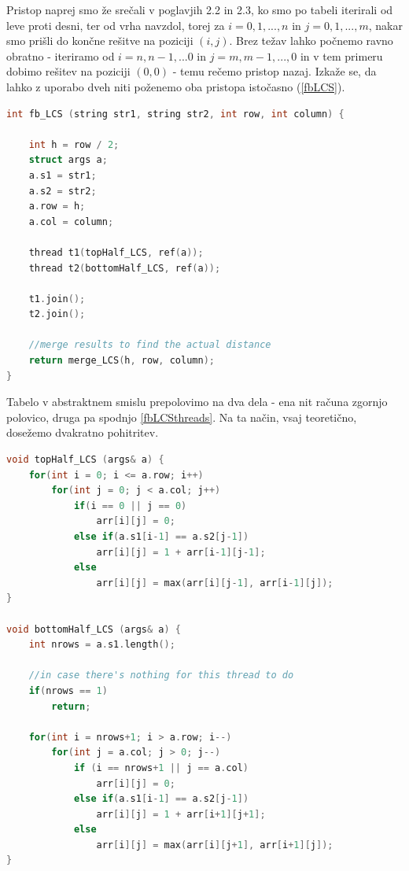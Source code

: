 \documentclass[a4paper,12pt,openright]{book}
\begin{document}
Pristop naprej smo že srečali v poglavjih 2.2 in 2.3, ko smo po tabeli iterirali od leve proti desni, ter od vrha navzdol, torej za \begin{math}i = 0, 1, ..., n\end{math} in \begin{math}j = 0, 1, ..., m\end{math}, nakar smo prišli do končne rešitve na poziciji \begin{math}(i, j)\end{math}. Brez težav lahko počnemo ravno obratno - iteriramo od \begin{math}i = n, n-1, ... 0\end{math} in \begin{math}j = m, m-1, ..., 0\end{math} in v tem primeru dobimo rešitev na poziciji \begin{math}(0, 0)\end{math} - temu rečemo pristop nazaj. Izkaže se, da lahko z uporabo dveh niti poženemo oba pristopa istočasno (\ref{fbLCS}). 

\bigskip
\begin{lstlisting}[language=C++, caption={Algoritem LCS naprej-nazaj}, captionpos=b, label=fbLCS]
int fb_LCS (string str1, string str2, int row, int column) {

    int h = row / 2;
    struct args a; 
    a.s1 = str1;
    a.s2 = str2;
    a.row = h;
    a.col = column;

    thread t1(topHalf_LCS, ref(a));
    thread t2(bottomHalf_LCS, ref(a));
    
    t1.join();
    t2.join();

    //merge results to find the actual distance
    return merge_LCS(h, row, column);
}
\end{lstlisting}

Tabelo v abstraktnem smislu prepolovimo na dva dela - ena nit računa zgornjo polovico, druga pa spodnjo \ref{fbLCSthreads}. Na ta način, vsaj teoretično, dosežemo dvakratno pohitritev. 

\bigskip
\begin{lstlisting}[language=C++, caption={Vsaka nit računa svojo polovico tabele}, captionpos=b, label=fbLCSthreads]
void topHalf_LCS (args& a) {
    for(int i = 0; i <= a.row; i++) 
        for(int j = 0; j < a.col; j++)
            if(i == 0 || j == 0)
                arr[i][j] = 0;        
            else if(a.s1[i-1] == a.s2[j-1])
                arr[i][j] = 1 + arr[i-1][j-1];
            else 
                arr[i][j] = max(arr[i][j-1], arr[i-1][j]);
}

void bottomHalf_LCS (args& a) {
    int nrows = a.s1.length();

    //in case there's nothing for this thread to do
    if(nrows == 1)
        return;

    for(int i = nrows+1; i > a.row; i--) 
        for(int j = a.col; j > 0; j--) 
            if (i == nrows+1 || j == a.col) 
                arr[i][j] = 0;
            else if(a.s1[i-1] == a.s2[j-1])
                arr[i][j] = 1 + arr[i+1][j+1];
            else
                arr[i][j] = max(arr[i][j+1], arr[i+1][j]);
}
\end{lstlisting}
\end{document}
